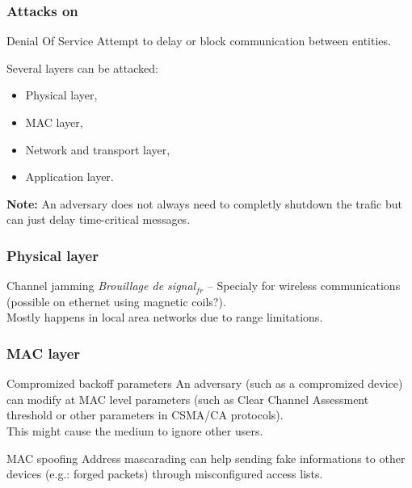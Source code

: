 \documentclass{beamer}
\begin{document}
\begin{frame}
    \frametitle{Attacks on }

    \begin{block}{Denial Of Service}
        Attempt to delay or block communication between entities.
    \end{block}
    \vfill
    Several layers can be attacked:
    \begin{itemize}
        \item Physical layer,
        \item MAC layer,
        \item Network and transport layer,
        \item Application layer.
    \end{itemize}
    \vfill
    {\bf Note:} An adversary does not always need to completly shutdown the trafic but can just delay time-critical messages.
\end{frame}

\begin{frame}
    \frametitle{Physical layer}

    \begin{block}{Channel jamming}
        {\em Brouillage de signal}$_{fr}$ -- Specialy for wireless communications (possible on ethernet using magnetic coils?).\\
        \medskip
        Mostly happens in local area networks due to range limitations.
    \end{block}
\end{frame}

\begin{frame}
    \frametitle{MAC layer}

    \begin{block}{Compromized backoff parameters}
        An adversary (such as a compromized device) can modify at MAC level parameters (such as Clear Channel Assessment threshold or other parameters in CSMA/CA protocols).\\
        \medskip
        This might cause the medium to ignore other users.
    \end{block}
    \vfill
    \begin{block}{MAC spoofing}
        Address mascarading can help sending fake informations to other devices (e.g.: forged packets) through misconfigured access lists.
    \end{block}
\end{frame}
\end{document}

